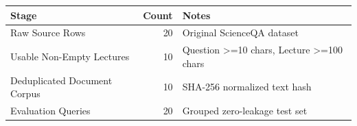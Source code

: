 \begin{tabular}{lrl}
\toprule
Stage & Count & Notes \\
\midrule
Raw Source Rows & 20 & Original ScienceQA dataset \\
Usable Non-Empty Lectures & 10 & Question >=10 chars, Lecture >=100 chars \\
Deduplicated Document Corpus & 10 & SHA-256 normalized text hash \\
Evaluation Queries & 20 & Grouped zero-leakage test set \\
\bottomrule
\end{tabular}

